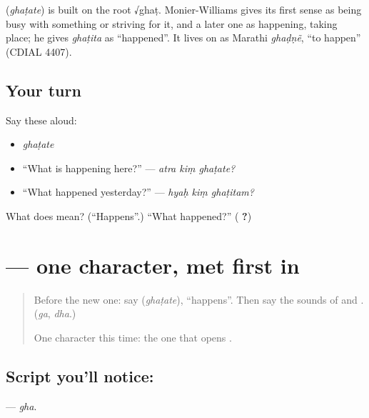 \begin{cousinweb}
\textbf{} (\emph{ghaṭate}) is built on the root √ghaṭ. Monier-Williams gives its first sense as being busy with something or striving for it, and a later one as happening, taking place; he gives \emph{ghaṭita} as \textquotedblleft{}happened\textquotedblright{}. It lives on as Marathi \emph{ghaḍṇẽ}, \textquotedblleft{}to happen\textquotedblright{} (CDIAL 4407).
\end{cousinweb}

\subsection*{Your turn}
Say these aloud:

\begin{itemize}
\raggedright
  \item \emph{ghaṭate}
  \item \textquotedblleft{}What is happening here?\textquotedblright{} — \emph{atra kiṃ ghaṭate?}
  \item \textquotedblleft{}What happened yesterday?\textquotedblright{} — \emph{hyaḥ kiṃ ghaṭitam?}
\end{itemize}

\begin{tcolorbox}[breakable,colback=teal!4,colframe=teal!35!black,title={Before you move on}]
What does \textbf{} mean? (\textquotedblleft{}Happens\textquotedblright{}.) \textquotedblleft{}What happened?\textquotedblright{} (\textbf{ ?})
\end{tcolorbox}
\section[\texorpdfstring{\sk{घ} (gha)}{घ (gha)}]{ — one character, met first in }

\label{lesson:SA-S226-letter-gha}



\begin{quote}
Before the new one: say \textbf{} (\emph{ghaṭate}), \textquotedblleft{}happens\textquotedblright{}. Then say the sounds of \textbf{} and \textbf{}. (\emph{ga}, \emph{dha}.)

One character this time: the one that opens \textbf{}.
\end{quote}

\subsection*{Script you'll notice: }
\textbf{} — \emph{gha}.

